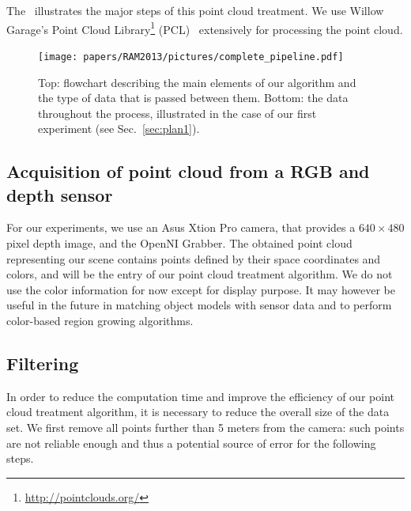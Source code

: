 The~ illustrates the major steps of this point cloud treatment. We use Willow Garage's Point Cloud Library\footnote{\url{http://pointclouds.org/}} (PCL)~\cite{rusu:icra:2011} extensively for processing the point cloud.
\begin{figure}[!htb]
	  \centering
	    \texttt{[image: papers/RAM2013/pictures/complete\_pipeline.pdf]}
	    \caption{Top: flowchart describing the main elements of our algorithm and the type of data that is passed between them.\newline
	    \hspace*{27pt} Bottom: the data throughout the process, illustrated in the case of our first experiment (see Sec.~\ref{sec:plan1}).}
	    \label{fig:pipeline}
\end{figure}


\subsection{Acquisition of point cloud from a RGB and depth sensor}
\label{subsect:Acquisition}

For our experiments, we use an Asus Xtion Pro camera, that provides a $640 \times 480$ pixel depth image, and the OpenNI Grabber. The obtained point cloud representing our scene contains points defined by their space coordinates and colors, and will be the entry of our point cloud treatment algorithm. We do not use the color information for now except for display purpose. It may however be useful in the future in matching object models with sensor data and to perform color-based region growing algorithms.

%

\subsection{Filtering}
\label{subsect:Filtering}

In order to reduce the computation time and improve the efficiency of our point cloud treatment algorithm, it is necessary to reduce the overall size of the data set. We first remove all points further than 5 meters from the camera: such points are not reliable enough and thus a potential source of error for the following steps.

